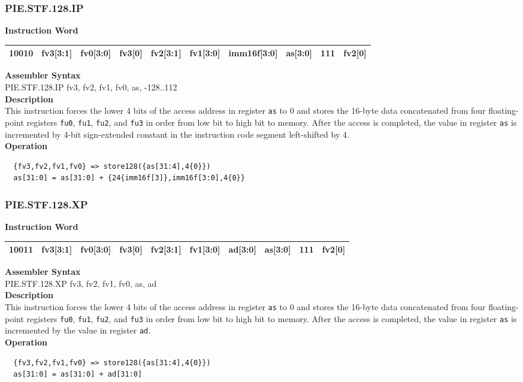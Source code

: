 \newpage
\subsubsection{PIE.STF.128.IP}\label{instruction:PIESTF128IP}
\setlength\tabcolsep{6pt}
\textbf{Instruction Word} \\
\begin{tabular}{|c|c|c|c|c|c|c|c|c|c|}
	\hline
	10010 & fv3[3:1] & fv0[3:0] & fv3[0] & fv2[3:1] & fv1[3:0] & imm16f[3:0] & as[3:0] & 111 & fv2[0] \\
	\hline
\end{tabular}

\textbf{Assembler Syntax} \\
PIE.STF.128.IP fv3, fv2, fv1, fv0, as, -128..112 \\
\textbf{Description} \\
This instruction forces the lower 4 bits of the access address in register \lstinline{as} to 0 and stores the 16-byte data concatenated from four floating-point registers \lstinline{fu0}, \lstinline{fu1}, \lstinline{fu2}, and \lstinline{fu3} in order from low bit to high bit to memory. After the access is completed, the value in register \lstinline{as} is incremented by 4-bit sign-extended constant in the instruction code segment left-shifted by 4.\\
\textbf{Operation}
\begin{lstlisting}
  {fv3,fv2,fv1,fv0} => store128({as[31:4],4{0}})
  as[31:0] = as[31:0] + {24{imm16f[3]},imm16f[3:0],4{0}}
\end{lstlisting}

\newpage
\subsubsection{PIE.STF.128.XP}\label{instruction:PIESTF128XP}
\setlength\tabcolsep{6pt}
\textbf{Instruction Word} \\
\begin{tabular}{|c|c|c|c|c|c|c|c|c|c|}
	\hline
	10011 & fv3[3:1] & fv0[3:0] & fv3[0] & fv2[3:1] & fv1[3:0] & ad[3:0] & as[3:0] & 111 & fv2[0] \\
	\hline
\end{tabular}

\textbf{Assembler Syntax} \\
PIE.STF.128.XP fv3, fv2, fv1, fv0, as, ad \\
\textbf{Description} \\
This instruction forces the lower 4 bits of the access address in register \lstinline{as} to 0 and stores the 16-byte data concatenated from four floating-point registers \lstinline{fu0}, \lstinline{fu1}, \lstinline{fu2}, and \lstinline{fu3} in order from low bit to high bit to memory. After the access is completed, the value in register \lstinline{as} is incremented by the value in register \lstinline{ad}.\\
\textbf{Operation}
\begin{lstlisting}
  {fv3,fv2,fv1,fv0} => store128({as[31:4],4{0}})
  as[31:0] = as[31:0] + ad[31:0]
\end{lstlisting}


